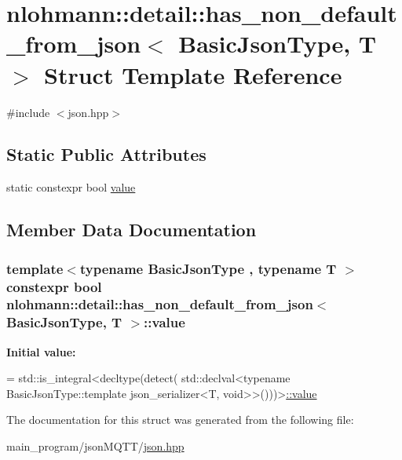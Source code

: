 \hypertarget{structnlohmann_1_1detail_1_1has__non__default__from__json}{}\section{nlohmann\+:\+:detail\+:\+:has\+\_\+non\+\_\+default\+\_\+from\+\_\+json$<$ Basic\+Json\+Type, T $>$ Struct Template Reference}
\label{structnlohmann_1_1detail_1_1has__non__default__from__json}


{\ttfamily \#include $<$json.\+hpp$>$}

\subsection*{Static Public Attributes}
\begin{DoxyCompactItemize}
\item 
static constexpr bool \hyperlink{structnlohmann_1_1detail_1_1has__non__default__from__json_ad34bb7cd3961fcafc2c5047a9782e931}{value}
\end{DoxyCompactItemize}


\subsection{Member Data Documentation}
\subsubsection[{\texorpdfstring{value}{value}}]{\setlength{\rightskip}{0pt plus 5cm}template$<$typename Basic\+Json\+Type , typename T $>$ constexpr bool {\bf nlohmann\+::detail\+::has\+\_\+non\+\_\+default\+\_\+from\+\_\+json}$<$ Basic\+Json\+Type, T $>$\+::value\hspace{0.3cm}{\ttfamily [static]}}\hypertarget{structnlohmann_1_1detail_1_1has__non__default__from__json_ad34bb7cd3961fcafc2c5047a9782e931}{}\label{structnlohmann_1_1detail_1_1has__non__default__from__json_ad34bb7cd3961fcafc2c5047a9782e931}
{\bfseries Initial value\+:}
\begin{DoxyCode}
= std::is\_integral<decltype(detect(
                                      std::declval<\textcolor{keyword}{typename} BasicJsonType::template json\_serializer<T,
       void>>()))>\hyperlink{structnlohmann_1_1detail_1_1has__non__default__from__json_ad34bb7cd3961fcafc2c5047a9782e931}{::value}
\end{DoxyCode}


The documentation for this struct was generated from the following file\+:\begin{DoxyCompactItemize}
\item 
main\+\_\+program/json\+M\+Q\+T\+T/\hyperlink{json_8hpp}{json.\+hpp}\end{DoxyCompactItemize}
